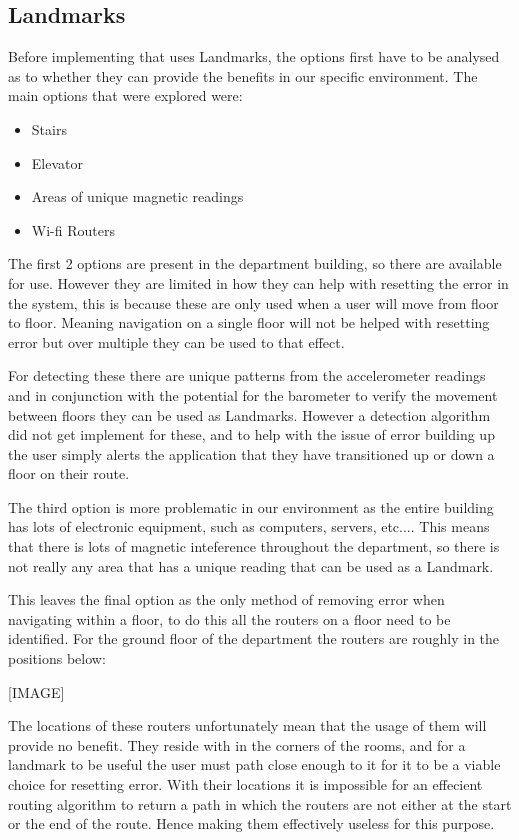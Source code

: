 \documentclass[main.tex]{subfiles}
\begin{document}
\subsection{Landmarks}

Before implementing that uses Landmarks, the options first have to be analysed as to whether they can provide the benefits in our specific environment. The main options that were explored were:

\begin{itemize}
	\item Stairs
	\item Elevator
	\item Areas of unique magnetic readings
	\item Wi-fi Routers
\end{itemize}

The first 2 options are present in the department building, so there are available for use. However they are limited in how they can help with resetting the error in the system, this is because these are only used when a user will move from floor to floor. Meaning navigation on a single floor will not be helped with resetting error but over multiple they can be used to that effect. 

For detecting these there are unique patterns from the accelerometer readings and in conjunction with the potential for the barometer to verify the movement between floors they can be used as Landmarks. However a detection algorithm did not get implement for these, and to help with the issue of error building up the user simply alerts the application that they have transitioned up or down a floor on their route.

The third option is more problematic in our environment as the entire building has lots of electronic equipment, such as computers, servers, etc.... This means that there is lots of magnetic inteference throughout the department, so there is not really any area that has a unique reading that can be used as a Landmark.

This leaves the final option as the only method of removing error when navigating within a floor, to do this all the routers on a floor need to be identified. For the ground floor of the department the routers are roughly in the positions below:

[IMAGE]

The locations of these routers unfortunately mean that the usage of them will provide no benefit. They reside with in the corners of the rooms, and for a landmark to be useful the user must path close enough to it for it to be a viable choice for resetting error. With their locations it is impossible for an effecient routing algorithm to return a path in which the routers are not either at the start or the end of the route. Hence making them effectively useless for this purpose.
\end{document}
